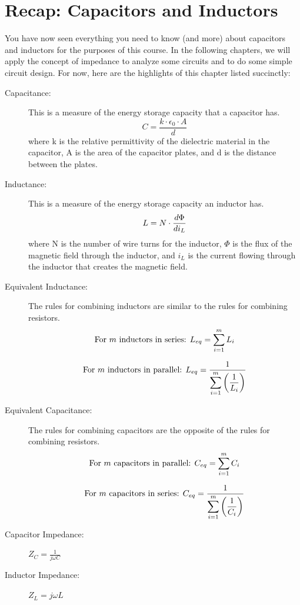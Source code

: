 \section{Recap: Capacitors and Inductors}
You have now seen everything you need to know (and more) about capacitors and inductors for the purposes of this course. In the following chapters, we will apply the concept of impedance to analyze some circuits and to do some simple circuit design. For now, here are the highlights of this chapter listed succinctly:
\begin{description}
\item[Capacitance:] This is a measure of the energy storage capacity that a capacitor has. $$C = \frac{k \cdot \epsilon_0 \cdot A}{d}$$ where k is the relative permittivity of the dielectric material in the capacitor, A is the area of the capacitor plates, and d is the distance between the plates.
\item[Inductance:] This is a measure of the energy storage capacity an inductor has. $$
L = N\cdot\frac{\mathnormal{d}\Phi}{\mathnormal{d}i_L}
$$ where N is the number of wire turns for the inductor, $\Phi$ is the flux of the magnetic field through the inductor, and $i_L$ is the current flowing through the inductor that creates the magnetic field.
\item[Equivalent Inductance:] The rules for combining inductors are similar to the rules for combining resistors. 
$$
\textnormal{For }m\textnormal{ inductors in series:   }L_{eq} = \displaystyle\sum_{i=1}^mL_i
$$

$$
\textnormal{For }m\textnormal{ inductors in parallel:   }L_{eq} = \frac{1}{\displaystyle\sum_{i=1}^m\left(\frac{1}{L_i}\right)}
$$

\item[Equivalent Capacitance:] The rules for combining capacitors are the opposite of the rules for combining resistors.
$$
\textnormal{For }m\textnormal{ capacitors in parallel:   }C_{eq} = \displaystyle\sum_{i=1}^mC_i
$$

$$
\textnormal{For }m\textnormal{ capacitors in series:   }C_{eq} = \frac{1}{\displaystyle\sum_{i=1}^m\left(\frac{1}{C_i}\right)}
$$

\item[Capacitor Impedance:] $Z_C = \frac{1}{j\omega C}$
\item[Inductor Impedance:] $Z_L = j\omega L$
\end{description}
